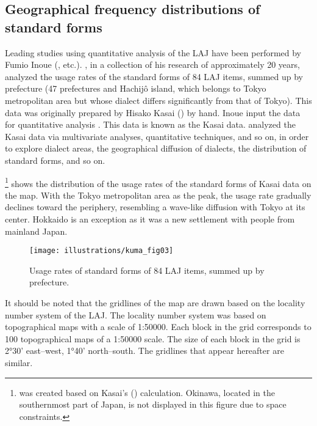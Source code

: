 \documentclass[output=paper]{LSP/langsci}
\begin{document}
\subsection{Geographical frequency distributions of standard forms}
\largerpage[-1]
Leading studies using quantitative analysis of the LAJ have been performed by Fumio Inoue (\citealt{inoue_keiryoteki_2001}, etc.). \citet{inoue_keiryoteki_2001}, in a collection of his research of approximately 20 years, analyzed the usage rates of the standard forms of 84 LAJ items, summed up by prefecture (47 prefectures and Hachijô island, which belongs to Tokyo metropolitan area but whose dialect differs significantly from that of Tokyo). This data was originally prepared by Hisako Kasai (\citeyear{kasai_hyojun_1981}) by hand. Inoue input the data for quantitative analysis \citep[89]{inoue_keiryoteki_2001}. This data is known as the Kasai data. \citet{inoue_keiryoteki_2001} analyzed the Kasai data via multivariate analyses, quantitative techniques, and so on, in order to explore dialect areas, the geographical diffusion of dialects, the distribution of standard forms, and so on.

\footnote{ was created based on Kasai’s (\citeyear{kasai_hyojun_1981}) calculation. Okinawa, located in the southernmost part of Japan, is not displayed in this figure due to space constraints.} shows the distribution of the usage rates of the standard forms of Kasai data on the map. With the Tokyo metropolitan area as the peak, the usage rate gradually declines toward the periphery, resembling a wave-like diffusion with Tokyo at its center. Hokkaido is an exception as it was a new settlement with people from mainland Japan.
\begin{figure}
\texttt{[image: illustrations/kuma\_fig03]}
\caption{Usage rates of standard forms of 84 LAJ items, summed up by prefecture.}          
\label{fig:kuma:3}
\end{figure} 

It should be noted that the gridlines of the map are drawn based on the locality number system of the LAJ. The locality number system was based on topographical maps with a scale of 1:50000. Each block in the grid corresponds to 100 topographical maps of a 1:50000 scale. The size of each block in the grid is 2°30' east–west, 1°40' north–south. The gridlines that appear hereafter are similar.
\end{document}

